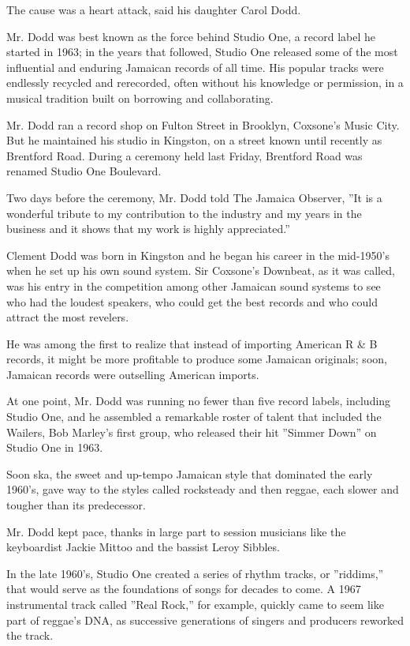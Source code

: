 The cause was a heart attack, said his daughter Carol Dodd.

Mr. Dodd was best known as the force behind Studio One, a record label
he started in 1963; in the years that followed, Studio One released some
of the most influential and enduring Jamaican records of all time. His
popular tracks were endlessly recycled and rerecorded, often without his
knowledge or permission, in a musical tradition built on borrowing and
collaborating.

Mr. Dodd ran a record shop on Fulton Street in Brooklyn, Coxsone's Music
City. But he maintained his studio in Kingston, on a street known until
recently as Brentford Road. During a ceremony held last Friday,
Brentford Road was renamed Studio One Boulevard.

Two days before the ceremony, Mr. Dodd told The Jamaica Observer, ''It
is a wonderful tribute to my contribution to the industry and my years
in the business and it shows that my work is highly appreciated.''

Clement Dodd was born in Kingston and he began his career in the
mid-1950's when he set up his own sound system. Sir Coxsone's Downbeat,
as it was called, was his entry in the competition among other Jamaican
sound systems to see who had the loudest speakers, who could get the
best records and who could attract the most revelers.

He was among the first to realize that instead of importing American R
\& B records, it might be more profitable to produce some Jamaican
originals; soon, Jamaican records were outselling American imports.

At one point, Mr. Dodd was running no fewer than five record labels,
including Studio One, and he assembled a remarkable roster of talent
that included the Wailers, Bob Marley's first group, who released their
hit ''Simmer Down'' on Studio One in 1963.

Soon ska, the sweet and up-tempo Jamaican style that dominated the early
1960's, gave way to the styles called rocksteady and then reggae, each
slower and tougher than its predecessor.

Mr. Dodd kept pace, thanks in large part to session musicians like the
keyboardist Jackie Mittoo and the bassist Leroy Sibbles.

In the late 1960's, Studio One created a series of rhythm tracks, or
''riddims,'' that would serve as the foundations of songs for decades to
come. A 1967 instrumental track called ''Real Rock,'' for example,
quickly came to seem like part of reggae's DNA, as successive
generations of singers and producers reworked the track.

